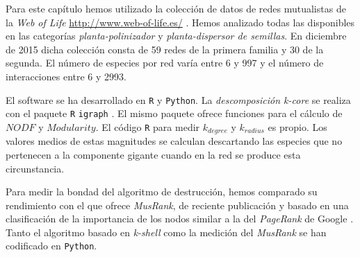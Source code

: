 Para este capítulo hemos utilizado la colección de datos de redes mutualistas de la \textit{Web of Life}  \url{http://www.web-of-life.es/} \cite{fortuna2014web}. Hemos analizado todas las disponibles en las categorías \textit{planta-polinizador} y \textit{planta-dispersor de semillas}. En diciembre de 2015 dicha colección consta de 59 redes de la primera familia y 30 de la segunda. El número de especies por red varía entre 6 y 997 y el número de interacciones entre 6 y 2993.

El software se ha desarrollado en \texttt{R} y \texttt{Python}. La \textit{descomposición k-core} se realiza con el paquete \texttt{R} \texttt{igraph} \cite{csardi2006igraph}. El mismo paquete ofrece funciones para el cálculo de $NODF$ y $Modularity$. El código \texttt{R} para medir ${k}_{degree}$ y ${k}_{radius}$ es propio. Los valores medios de estas magnitudes se calculan descartando las especies que no pertenecen a la componente gigante cuando en la red se produce esta circunstancia. 

Para medir la bondad del algoritmo de destrucción, hemos comparado su rendimiento con el que ofrece \textit{MusRank}, de reciente publicación y basado en una clasificación de la importancia de los nodos similar a la del \textit{PageRank} de Google  \citep{dominguez2015ranking}. Tanto el algoritmo basado en \textit{k-shell} como la medición del \textit{MusRank} se han codificado en \texttt{Python}.

